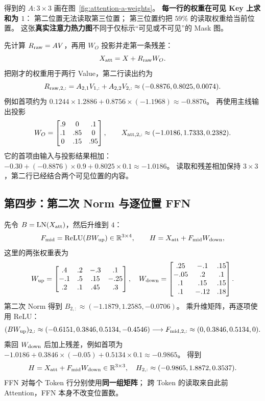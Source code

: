 得到的 $A:3\times3$ 画在图~\ref{fig:attention-a-weights}。
\textbf{每一行的权重在可见 Key 上求和为 $1$}：
第二位置无法读取第三位置；
第三位置约把 $59\%$ 的读取权重给当前位置。
这张\textbf{真实注意力热力图}不同于仅标示“可见或不可见”的 Mask 图。

\par\medskip


先计算 $R_{\rm raw}=AV$，再用 $W_O$ 投影并走第一条残差：
\[
X_{\rm att}=X+R_{\rm raw}W_O.
\]
把刚才的权重用于两行 Value，第二行读出约为
\[
R_{{\rm raw},2,:}=A_{2,1}V_{1,:}+A_{2,2}V_{2,:}
\approx(-0.8876,0.8025,0.0074).
\]
例如首项约为 $0.1244\times1.2886+0.8756\times(-1.1968)\approx-0.8876$。
再使用主线输出投影
\[
W_O=\begin{bmatrix}.9&0&.1\\.1&.85&0\\0&.15&.95\end{bmatrix},\qquad
X_{{\rm att},2,:}\approx(-1.0186,1.7333,0.2382).
\]
它的首项由输入与投影结果相加：
$-0.30+(-0.8876)\times0.9+0.8025\times0.1\approx-1.0186$。
读取和残差相加保持 $3\times3$，第二行已经结合两个可见位置的内容。

\subsection{第四步：第二次 Norm 与逐位置 FFN}

先令 $B=\operatorname{LN}(X_{\rm att})$，然后升维到 $4$：
\[
F_{\rm mid}=\operatorname{ReLU}(BW_{\rm up})\in\mathbb{R}^{3\times4},
\qquad
H=X_{\rm att}+F_{\rm mid}W_{\rm down},
\]
这里的两张权重表为
\[
W_{\rm up}=\begin{bmatrix}.4&.2&-.3&.1\\-.1&.5&.15&-.25\\.2&.1&.45&.3\end{bmatrix},\quad
W_{\rm down}=\begin{bmatrix}.25&-.1&.15\\-.05&.2&.1\\.1&.15&.15\\.1&-.12&.18\end{bmatrix}.
\]
第二次 Norm 得到 $B_{2,:}\approx(-1.1879,1.2585,-0.0706)$。
乘升维矩阵，再逐项使用 ReLU：
\[
(BW_{\rm up})_{2,:}\approx(-0.6151,0.3846,0.5134,-0.4546)
\longrightarrow F_{{\rm mid},2,:}\approx(0,0.3846,0.5134,0).
\]
乘回 $W_{\rm down}$ 后加上残差，例如首项为
$-1.0186+0.3846\times(-0.05)+0.5134\times0.1\approx-0.9865$。
得到
\begin{equation}
H=X_{\rm att}+F_{\rm mid}W_{\rm down}\in\mathbb{R}^{3\times3},
\quad H_{2,:}\approx(-0.9865,1.8872,0.3537).
\label{eq:three-token-block-output}
\end{equation}
FFN 对每个 Token 行分别使用\textbf{同一组矩阵}；
跨 Token 的读取来自此前 Attention，FFN 本身不改变位置数。

